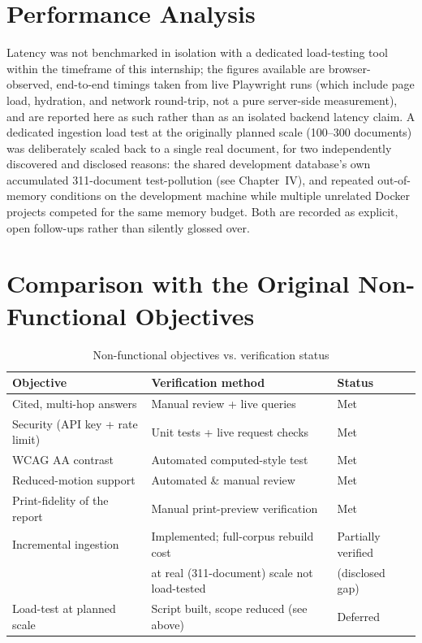 \documentclass[12pt,a4paper]{report}
\begin{document}
\section{Performance Analysis}

Latency was not benchmarked in isolation with a dedicated load-testing tool
within the timeframe of this internship; the figures available are
browser-observed, end-to-end timings taken from live Playwright runs (which
include page load, hydration, and network round-trip, not a pure server-side
measurement), and are reported here as such rather than as an isolated
backend latency claim. A dedicated ingestion load test at the originally
planned scale (100--300 documents) was deliberately scaled back to a single
real document, for two independently discovered and disclosed reasons: the
shared development database's own accumulated 311-document test-pollution
(see Chapter~IV), and repeated out-of-memory conditions on the development
machine while multiple unrelated Docker projects competed for the same
memory budget. Both are recorded as explicit, open follow-ups rather than
silently glossed over.

\section{Comparison with the Original Non-Functional Objectives}

\begin{table}[H]
\centering
\caption{Non-functional objectives vs. verification status}
\label{tab:nfrcheck}
\begin{tabularx}{\textwidth}{@{}l X l@{}}
\toprule
\textbf{Objective} & \textbf{Verification method} & \textbf{Status} \\
\midrule
Cited, multi-hop answers & Manual review + live queries & Met \\
Security (API key + rate limit) & Unit tests + live request checks & Met \\
\ac{WCAG} AA contrast & Automated computed-style test & Met \\
Reduced-motion support & Automated \& manual review & Met \\
Print-fidelity of the report & Manual print-preview verification & Met \\
Incremental ingestion & Implemented; full-corpus rebuild cost & Partially verified \\
 & at real (311-document) scale not load-tested & (disclosed gap) \\
Load-test at planned scale & Script built, scope reduced (see above) & Deferred \\
\bottomrule
\end{tabularx}
\end{table}
\end{document}

